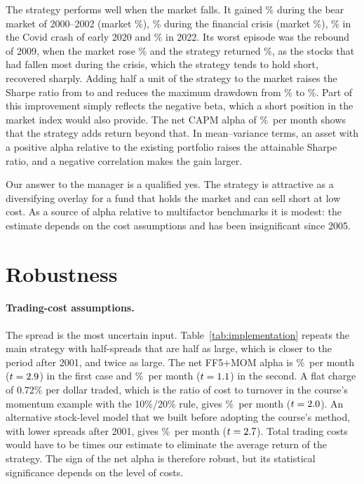 \documentclass[12pt,a4paper]{article}
\newcommand{\pmo}{\%~per month}
\begin{document}
The strategy performs well when the market falls. It gained \crdot\% during the bear market of 2000--2002 (market \crdotm\%), \crgfc\% during the financial crisis (market \crgfcm\%), \crcovid\% in the Covid crash of early 2020 and \crrate\% in 2022. Its worst episode was the rebound of 2009, when the market rose \crmomm\% and the strategy returned \crmom\%, as the stocks that had fallen most during the crisis, which the strategy tends to hold short, recovered sharply. Adding half a unit of the strategy to the market raises the Sharpe ratio from \ovsrzero{} to \ovsrhalf{} and reduces the maximum drawdown from \ovddzero\% to \ovddhalf\%. Part of this improvement simply reflects the negative beta, which a short position in the market index would also provide. The net CAPM alpha of \netfullcapm\pmo{} shows that the strategy adds return beyond that. In mean--variance terms, an asset with a positive alpha relative to the existing portfolio raises the attainable Sharpe ratio, and a negative correlation makes the gain larger.

Our answer to the manager is a qualified yes. The strategy is attractive as a diversifying overlay for a fund that holds the market and can sell short at low cost. As a source of alpha relative to multifactor benchmarks it is modest: the estimate depends on the cost assumptions and has been insignificant since 2005.

\section{Robustness}\label{sec:robust}

\paragraph{Trading-cost assumptions.} The spread is the most uncertain input. Table~\ref{tab:implementation} repeats the main strategy with half-spreads that are half as large, which is closer to the period after 2001, and twice as large. The net FF5+MOM alpha is \robsphalf\pmo{} ($t=2.9$) in the first case and \robsptwo\pmo{} ($t=1.1$) in the second. A flat charge of 0.72\% per dollar traded, which is the ratio of cost to turnover in the course's momentum example with the 10\%/20\% rule, gives \robflat\pmo{} ($t=2.0$). An alternative stock-level model that we built before adopting the course's method, with lower spreads after 2001, gives \robstock\pmo{} ($t=2.7$). Total trading costs would have to be \bemult{} times our estimate to eliminate the average return of the strategy. The sign of the net alpha is therefore robust, but its statistical significance depends on the level of costs.
\end{document}
